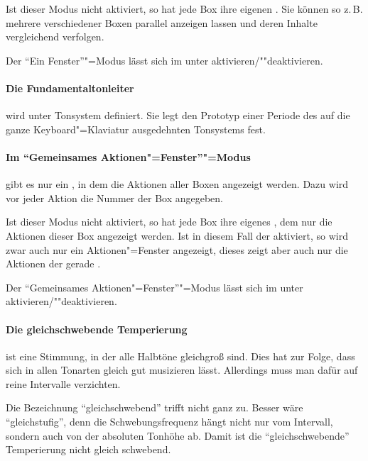 {  Ist dieser Modus nicht aktiviert, so hat jede Box ihre eigenen
  . Sie können so z.\,B.
  mehrere 
  verschiedener Boxen parallel anzeigen lassen und deren Inhalte
  vergleichend verfolgen.

  Der "`Ein Fenster"'"=Modus lässt sich im
   unter  aktivieren/""deaktivieren.

\paragraph{Die Fundamentaltonleiter}\label{sec:DV_FUNDTONLEITER}\label{sec:DV_FT}
wird unter Tonsystem definiert. Sie legt den Prototyp einer Periode
des auf die ganze Keyboard"=Klaviatur ausgedehnten Tonsystems fest.

\paragraph{Im "`Gemeinsames
    Aktionen"=Fenster"'"=Modus}\label{sec:DV_CAW} gibt es nur ein
  , in dem die Aktionen
  aller Boxen angezeigt werden. Dazu wird vor jeder Aktion die Nummer
  der Box angegeben.

  Ist dieser Modus nicht aktiviert, so hat jede Box ihre eigenes
  , dem nur die Aktionen
  dieser Box angezeigt werden. Ist in diesem Fall der
   aktiviert, so wird zwar
  auch nur ein Aktionen"=Fenster angezeigt, dieses zeigt aber auch nur
  die Aktionen der gerade .

  Der "`Gemeinsames Aktionen"=Fenster"'"=Modus lässt sich im
   unter  aktivieren/""deaktivieren.

\paragraph{Die gleichschwebende Temperierung}\label{sec:MT_EQUAL} ist eine
  Stimmung, in der alle Halbtöne gleichgroß sind.  Dies hat zur Folge,
  dass sich in allen Tonarten gleich gut musizieren lässt.  Allerdings
  muss man dafür auf reine Intervalle verzichten. 

  Die Bezeichnung "`gleichschwebend"' trifft nicht ganz zu. Besser
  wäre "`gleichstufig"', denn die Schwebungsfrequenz hängt nicht nur
  vom Intervall, sondern auch von der absoluten Tonhöhe ab. Damit ist
  die "`gleichschwebende"' Temperierung nicht gleich schwebend.

}
